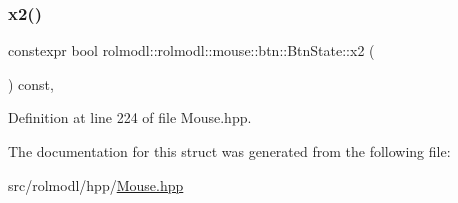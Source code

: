 \subsubsection{\texorpdfstring{x2()}{x2()}}
{\footnotesize\ttfamily constexpr bool rolmodl\+::rolmodl\+::mouse\+::btn\+::\+Btn\+State\+::x2 (\begin{DoxyParamCaption}{ }\end{DoxyParamCaption}) const\hspace{0.3cm}{\ttfamily [inline]}, {\ttfamily [noexcept]}}



Definition at line 224 of file Mouse.\+hpp.



The documentation for this struct was generated from the following file\+:\begin{DoxyCompactItemize}
\item 
src/rolmodl/hpp/\mbox{\hyperlink{_mouse_8hpp}{Mouse.\+hpp}}\end{DoxyCompactItemize}
